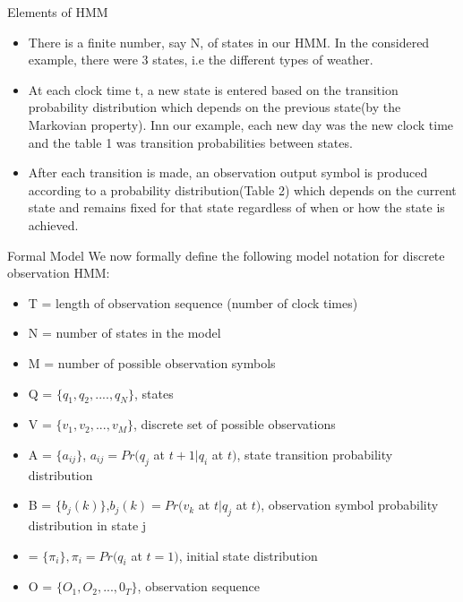 \documentclass[compress]{beamer}
\begin{document}
\begin{frame}{Elements of HMM}
\begin{itemize}
\item{There is a finite number, say N, of states in our HMM. In the considered example, there were 3 states, i.e the different types of weather.}
\pause
\item{At each clock time t, a new state is entered based on the transition probability distribution which depends on the previous state(by the Markovian property). Inn our example, each new day was the new clock time and the table 1 was transition probabilities between states. }
\pause
\item{After each transition is made, an observation output symbol is produced according to a probability distribution(Table 2) which depends on the current state and remains fixed for that state regardless of when or how the state is achieved.}
\end{itemize}
\end{frame}
\begin{frame}{Formal Model}
We now formally define the following model notation for discrete observation HMM:
\begin{itemize}
\item{T = length of observation sequence (number of clock times)}
\pause
\item{N = number of states in the model}
\pause
\item{M = number of possible observation symbols}
\pause
\item{Q = $\{q_1, q_2, ....,q_N\}$, states}
\pause
\item{V = $\{v_1, v_2, ...,v_M\}$, discrete set of possible observations}
\pause
\item{A = $\{a_{ij}\}$, $a_{ij}=Pr(q_j$ at $t+1|q_i$ at $t)$, state transition probability distribution}
\pause
\item{B = $\{b_j(k)\}$,$b_j(k)=Pr(v_k$ at $t|q_j$ at $t)$, observation symbol probability distribution in state j}
\pause
\item{\pi = $\{\pi_i\}, \pi_i=Pr(q_i$  at $t=1)$, initial state distribution}
\pause
\item{O = $\{O_1,O_2,...,0_T\}$, observation sequence}
\end{itemize}
\end{frame}
\end{document}
